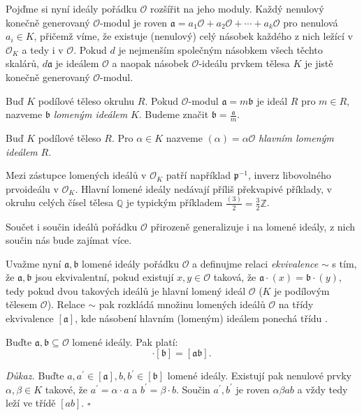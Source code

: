 \documentclass[12pt]{report}
\begin{document}
Pojďme si nyní ideály pořádku $\mathcal{O}$ rozšířit na jeho moduly. Každý nenulový konečně generovaný $\mathcal{O}$-modul je roven $\mathfrak{a} =  a_1 \mathcal{O} + a_2 \mathcal{O} + \cdots + a_k \mathcal{O}$ pro nenulová $a_i \in K$, přičemž víme, že existuje (nenulový) celý násobek každého z nich ležící v $\mathcal{O}_K$ a tedy i v $\mathcal{O}$. Pokud $d$ je nejmenším společným násobkem všech těchto skalárů, $d \mathfrak{a}$ je ideálem $\mathcal{O}$ a naopak násobek $\mathcal{O}$-ideálu prvkem tělesa $K$ je jistě konečně generovaný $\mathcal{O}$-modul.

\begin{definice}
Buď $K$ podílové těleso okruhu $R$. Pokud $\mathcal{O}$-modul $\mathfrak{a} =  m \mathfrak{b}$ je ideál $R$ pro $m \in R$, nazveme $\mathfrak{b}$ \textit{lomeným ideálem} $K$. Budeme značit $\mathfrak{b} = \frac{\mathfrak{a}}{m}$.
\end{definice}

\begin{definice}
Buď $K$ podílové těleso $R$. Pro $\alpha \in K$ nazveme $(\alpha) = \alpha \mathcal{O}$ \textit{hlavním lomeným ideálem} $R$.
\end{definice}

Mezi zástupce lomených ideálů v $\mathcal{O}_K$ patří například $\mathfrak{p}^{-1}$, inverz libovolného prvoideálu v $\mathcal{O}_K$. Hlavní lomené ideály nedávají příliš překvapivé příklady, v okruhu celých čísel tělesa $\mathbb{Q}$ je typickým příkladem $\frac{(3)}{2} = \frac{3}{2} \mathbb{Z}$.

Součet i součin ideálů pořádku $\mathcal{O}$ přirozeně generalizuje i na lomené ideály, z nich součin nás bude zajímat více.

Uvažme nyní $\mathfrak{a},\mathfrak{b}$ lomené ideály pořádku $\mathcal{O}$ a definujme relaci \textit{ekvivalence} $\sim$ s tím, že $\mathfrak{a},\mathfrak{b}$ jsou ekvivalentní, pokud existují $x,y \in \mathcal{O}$ taková, že $\mathfrak{a} \cdot (x) = \mathfrak{b} \cdot (y)$, tedy pokud  dvou takových ideálů je hlavní lomený ideál $\mathcal{O}$ ($K$ je podílovým tělesem $\mathcal{O}$). Relace $\sim$ pak rozkládá množinu lomených ideálů $\mathcal{O}$ na třídy ekvivalence $[\mathfrak{a}]$, kde násobení hlavním (lomeným) ideálem ponechá třídu .

\begin{veta}
Buďte $\mathfrak{a},\mathfrak{b} \subseteq \mathcal{O}$ lomené ideály. Pak platí:
\begin{equation*}
[\mathfrak{a}] \cdot [\mathfrak{b}] = [\mathfrak{ab}].
\end{equation*}
\end{veta}
\noindent \textit{Důkaz.} Buďte $a,a^\prime \in [\mathfrak{a}], b, b^\prime \in [\mathfrak{b}]$ lomené ideály. Existují pak nenulové prvky $\alpha,\beta \in K$ takové, že $a^\prime = \alpha \cdot a$ a $b^\prime = \beta \cdot b$. Součin $a^\prime,b^\prime$ je roven $\alpha \beta a b$ a vždy tedy leží ve třídě $[ab]$. \hfill $\square$\\
\end{document}
